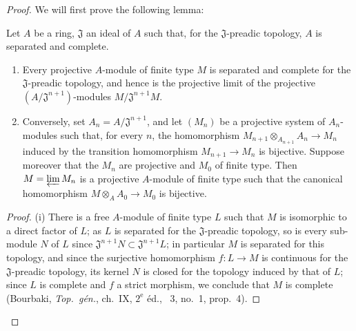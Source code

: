 \begin{proof}
We will first prove the following lemma:

\begin{lemma}[18.3.2.1]
\label{IV.18.3.2.1}
Let $A$ be a ring, $\mathfrak{J}$ an ideal of $A$ such that, for the $\mathfrak{J}$-preadic topology, $A$ is separated and complete.
\begin{enumerate}
  \item[(i)] Every projective $A$-module of finite type $M$ is separated and complete for the $\mathfrak{J}$-preadic topology, and hence is the projective limit of the projective $(A/\mathfrak{J}^{n+1})$-modules $M/\mathfrak{J}^{n+1}M$.
  \item[(ii)] Conversely, set $A_n=A/\mathfrak{J}^{n+1}$, and let $(M_n)$ be a projective system of $A_n$-modules such that, for every $n$, the homomorphism $M_{n+1}\otimes_{A_{n+1}}A_n\to M_n$ induced by the transition homomorphism $M_{n+1}\to M_n$ is bijective.
Suppose moreover that the $M_n$ are projective and $M_0$ of finite type.
Then $M=\varprojlim M_n$ is a projective $A$-module of finite type such that the canonical homomorphism $M\otimes_A A_0\to M_0$ is bijective.
\end{enumerate}
\end{lemma}

\begin{proof}
(i) There is a free $A$-module of finite type $L$ such that $M$ is isomorphic to a direct factor of $L$;
as $L$ is separated for the $\mathfrak{J}$-preadic topology, so is every sub-module $N$ of $L$ since $\mathfrak{J}^{n+1}N\subset\mathfrak{J}^{n+1}L$;
in particular $M$ is separated for this topology, and since the surjective homomorphism $f:L\to M$ is continuous for the $\mathfrak{J}$-preadic topology, its kernel $N$ is closed for the topology induced by that of $L$;
since $L$ is complete and $f$ a strict morphism, we conclude that $M$ is complete (Bourbaki, \emph{Top.\ g\'en.}, ch.~IX, $2^{\text{e}}$ \'ed., \textsection~3, no.~1, prop.~4).


\end{proof}
\end{proof}

